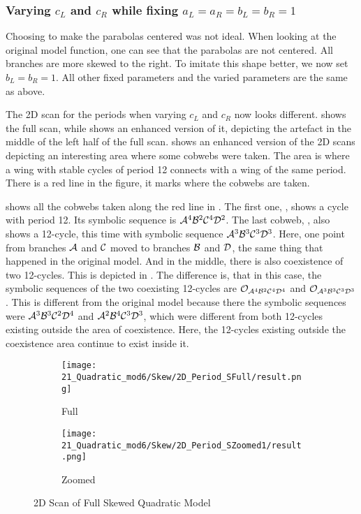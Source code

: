 \subsubsection{Varying $c_L$ and $c_R$ while fixing $a_L = a_R = b_L = b_R = 1$}

Choosing to make the parabolas centered was not ideal.
When looking at the original model function, one can see that the parabolas are not centered.
All branches are more skewed to the right.
To imitate this shape better, we now set $b_L = b_R = 1$.
All other fixed parameters and the varied parameters are the same as above.

The 2D scan for the periods when varying $c_L$ and $c_R$ now looks different.
 shows the full scan, while  shows an enhanced version of it, depicting the artefact in the middle of the left half of the full scan.
 shows an enhanced version of the 2D scans depicting an interesting area where some cobwebs were taken.
The area is where a wing with stable cycles of period 12 connects with a wing of the same period.
There is a red line in the figure, it marks where the cobwebs are taken.

 shows all the cobwebs taken along the red line in .
The first one, , shows a cycle with period 12.
Its symbolic sequence is $\mathcal{A}^4\mathcal{B}^2\mathcal{C}^4\mathcal{D}^2$.
The last cobweb, , also shows a 12-cycle, this time with symbolic sequence $\mathcal{A}^3\mathcal{B}^3\mathcal{C}^3\mathcal{D}^3$.
Here, one point from branches $\mathcal{A}$ and $\mathcal{C}$ moved to branches $\mathcal{B}$ and $\mathcal{D}$, the same thing that happened in the original model.
And in the middle, there is also coexistence of two 12-cycles.
This is depicted in .
The difference is, that in this case, the symbolic sequences of the two coexisting 12-cycles are $\mathcal{O}_{\mathcal{A}^4\mathcal{B}^2\mathcal{C}^4\mathcal{D}^4}$ and $\mathcal{O}_{\mathcal{A}^3\mathcal{B}^3\mathcal{C}^3\mathcal{D}^3}$.
This is different from the original model because there the symbolic sequences were $\mathcal{A}^3\mathcal{B}^3\mathcal{C}^2\mathcal{D}^4$ and $\mathcal{A}^2\mathcal{B}^4\mathcal{C}^3\mathcal{D}^3$, which were different from both 12-cycles existing outside the area of coexistence.
Here, the 12-cycles existing outside the coexistence area continue to exist inside it.

\begin{figure}
	\centering
	\begin{subfigure}{0.4\textwidth}
		\centering
		\texttt{[image: 21\_Quadratic\_mod6/Skew/2D\_Period\_SFull/result.png]}
		\caption{Full}
		\label{fig:quadratic.full.skew.2d.full}
	\end{subfigure}
	\begin{subfigure}{0.4\textwidth}
		\centering
		\texttt{[image: 21\_Quadratic\_mod6/Skew/2D\_Period\_SZoomed1/result.png]}
		\caption{Zoomed}
		\label{fig:quadratic.full.skew.2d.z1}
	\end{subfigure}
	\caption{2D Scan of Full Skewed Quadratic Model}
\end{figure}

